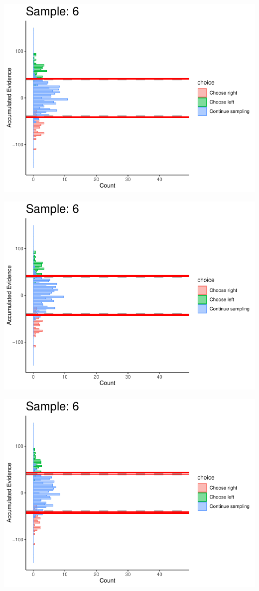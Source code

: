\documentclass[
]{book}
\begin{document}
\begin{center}\includegraphics[width=0.8\linewidth]{LateNightBayes_files/figure-latex/collapsing_dcb-56} \end{center}

\begin{center}\includegraphics[width=0.8\linewidth]{LateNightBayes_files/figure-latex/collapsing_dcb-57} \end{center}

\begin{center}\includegraphics[width=0.8\linewidth]{LateNightBayes_files/figure-latex/collapsing_dcb-58} \end{center}
\end{document}
